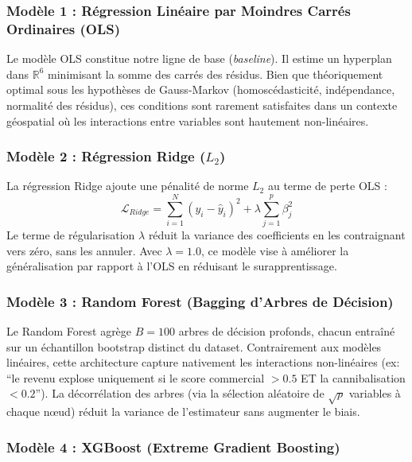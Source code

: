 \documentclass[11pt,a4paper,twoside]{report}
\begin{document}
\FloatBarrier
\subsubsection{Modèle 1 : Régression Linéaire par Moindres Carrés Ordinaires (OLS)}

Le modèle OLS constitue notre ligne de base (\textit{baseline}). Il estime un hyperplan dans $\mathbb{R}^6$ minimisant la somme des carrés des résidus. Bien que théoriquement optimal sous les hypothèses de Gauss-Markov (homoscédasticité, indépendance, normalité des résidus), ces conditions sont rarement satisfaites dans un contexte géospatial où les interactions entre variables sont hautement non-linéaires.

\subsubsection{Modèle 2 : Régression Ridge ($L_2$)}

La régression Ridge ajoute une pénalité de norme $L_2$ au terme de perte OLS :
\begin{equation}
\mathcal{L}_{Ridge} = \sum_{i=1}^{N} (y_i - \hat{y}_i)^2 + \lambda \sum_{j=1}^{p} \beta_j^2
\end{equation}
Le terme de régularisation $\lambda$ réduit la variance des coefficients en les contraignant vers zéro, sans les annuler. Avec $\lambda = 1.0$, ce modèle vise à améliorer la généralisation par rapport à l'OLS en réduisant le surapprentissage.

\subsubsection{Modèle 3 : Random Forest (Bagging d'Arbres de Décision)}

Le Random Forest agrège $B = 100$ arbres de décision profonds, chacun entraîné sur un échantillon bootstrap distinct du dataset. Contrairement aux modèles linéaires, cette architecture capture nativement les interactions non-linéaires (ex: ``le revenu explose uniquement si le score commercial $> 0.5$ ET la cannibalisation $< 0.2$''). La décorrélation des arbres (via la sélection aléatoire de $\sqrt{p}$ variables à chaque nœud) réduit la variance de l'estimateur sans augmenter le biais.

\subsubsection{Modèle 4 : XGBoost (Extreme Gradient Boosting)}
\end{document}
